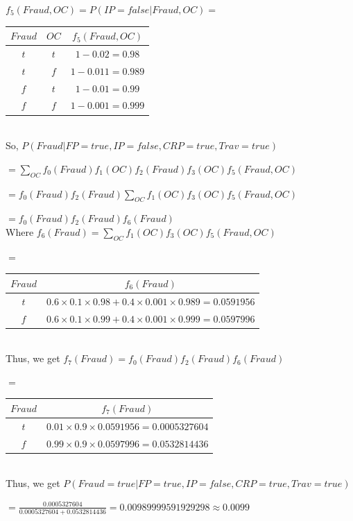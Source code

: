 \documentclass[10pt]{article}
\begin{document}
\begin{enumerate}
	$f_5(Fraud, OC) = P(IP = false | Fraud, OC) = $
	\begin{tabular}{|c|c|c|}
	\hline
 	  $Fraud$ & $OC$ & $f_5(Fraud, OC)$ \\
	\hline
	  $t$ & $t$ & $1 - 0.02 = 0.98$  \\
	\hline
	 $t$ & $f$ & $1 - 0.011 = 0.989$  \\
	\hline
	  $f$ & $t$ & $1 - 0.01 = 0.99$ \\
	\hline
	$f$ & $f$ & $1 - 0.001 = 0.999$  \\
	\hline
	\end{tabular}\\

	So, $P(Fraud | FP = true, IP = false, CRP = true, Trav = true)$
	
	$= \sum_{OC}f_0(Fraud)f_1(OC)f_2(Fraud)f_3(OC)f_5(Fraud, OC) $
	
	$= f_0(Fraud)f_2(Fraud)\sum_{OC}f_1(OC)f_3(OC)f_5(Fraud, OC)$
	
	$= f_0(Fraud)f_2(Fraud)f_6(Fraud)$\\
	
	Where $f_6(Fraud) = \sum_{OC}f_1(OC)f_3(OC)f_5(Fraud, OC)$
	
	$=$
	\begin{tabular}{|c|c|}
	\hline
 	  $Fraud$ & $f_6(Fraud)$ \\
	\hline
	  $t$ & $0.6 \times 0.1 \times 0.98 + 0.4 \times 0.001 \times 0.989 = 0.0591956$  \\
	\hline
	  $f$ & $0.6 \times 0.1 \times 0.99 + 0.4 \times 0.001 \times 0.999 = 0.0597996$ \\
	\hline
	\end{tabular}\\
	
	Thus, we get $f_7(Fraud) = f_0(Fraud)f_2(Fraud)f_6(Fraud)$
	
	$=$
	\begin{tabular}{|c|c|}
	\hline
 	  $Fraud$ & $f_7(Fraud)$ \\
	\hline
	  $t$ & $0.01 \times 0.9 \times 0.0591956 = 0.0005327604$  \\
	\hline
	  $f$ & $0.99 \times 0.9 \times 0.0597996 = 0.0532814436$ \\
	\hline
	\end{tabular}\\
	
	Thus, we get $P(Fraud = true | FP = true, IP = false, CRP = true, Trav = true)$
	
	$= \frac{0.0005327604}{0.0005327604 + 0.0532814436} = 0.00989999591929298 \approx 0.0099$
	

\end{enumerate}
\end{document}
